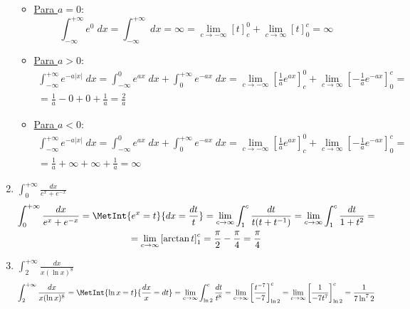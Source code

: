 \begin{ejercicio}
\begin{enumerate}
    \begin{itemize}
        \item \underline{Para $a=0$}:
        \begin{equation*}
            \int_{-\infty}^{+\infty} e^{0}\;dx
            = \int_{-\infty}^{+\infty}\;dx = \infty = \lim_{c\to -\infty} [t]_c^0 + \lim_{c\to \infty}[t]_0^c = \infty
        \end{equation*}

        \item \underline{Para $a>0$}:
        \begin{multline*}
            \int_{-\infty}^{+\infty} e^{-a|x|}\;dx
            = \int_{-\infty}^{0} e^{ax}\;dx
            + \int_{0}^{+\infty} e^{-ax}\;dx
            = \lim_{c\to -\infty}\left[\frac{1}{a}e^{ax}\right]_c^0
            + \lim_{c\to \infty}\left[-\frac{1}{a}e^{-ax}\right]_0^c
            =\\=
            \frac{1}{a} - 0 +0 +\frac{1}{a} = \frac{2}{a}
        \end{multline*}

        \item \underline{Para $a<0$}:
        \begin{multline*}
            \int_{-\infty}^{+\infty} e^{-a|x|}\;dx
            = \int_{-\infty}^{0} e^{ax}\;dx
            + \int_{0}^{+\infty} e^{-ax}\;dx
            = \lim_{c\to -\infty}\left[\frac{1}{a}e^{ax}\right]_c^0
            + \lim_{c\to \infty}\left[-\frac{1}{a}e^{-ax}\right]_0^c
            =\\=
            \frac{1}{a} + \infty +\infty +\frac{1}{a} = \infty
        \end{multline*}
    \end{itemize}

    
    \item $\displaystyle \int_{0}^{+\infty} \frac{dx}{e^x+e^{-x}}$
    \begin{multline*}
        \int_{0}^{+\infty} \frac{dx}{e^x+e^{-x}} = \MetInt{e^x = t}{dx=\frac{dt}{t}} = \lim_{c\to \infty}\int_1^c \frac{dt}{t(t+t^{-1})}
        = \lim_{c\to \infty}\int_1^c \frac{dt}{1+t^2}
        =\\= \lim_{c\to \infty}\left[\arctan t\right]_1^c=\frac{\pi}{2} - \frac{\pi}{4} = \frac{\pi}{4}
    \end{multline*}
    \item $\displaystyle \int_{2}^{+\infty} \frac{dx}{x(\ln x)^8}$
    \begin{multline*}
        \int_{2}^{+\infty} \frac{dx}{x(\ln x)^8} = \MetInt{\ln x = t}{\frac{dx}{x} = dt} = \lim_{c\to \infty} \int_{\ln 2}^c \frac{dt}{t^8} = \lim_{c\to \infty}\left[\frac{t^{-7}}{-7}\right]_{\ln 2}^c
        = \lim_{c\to \infty}\left[\frac{1}{-7t^7}\right]_{\ln 2}^c = \frac{1}{7\ln^7 2}
    \end{multline*}


\end{enumerate}
\end{ejercicio}

